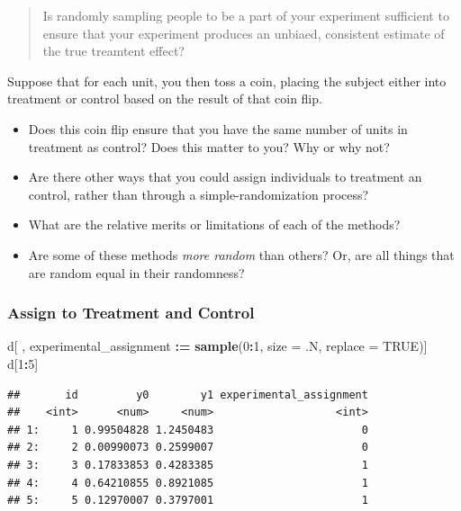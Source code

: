 \documentclass[
]{article}
\newenvironment{Shaded}{\begin{snugshade}}{\end{snugshade}}
\newcommand{\AttributeTok}[1]{\textcolor[rgb]{0.13,0.29,0.53}{#1}}
\newcommand{\ConstantTok}[1]{\textcolor[rgb]{0.56,0.35,0.01}{#1}}
\newcommand{\DecValTok}[1]{\textcolor[rgb]{0.00,0.00,0.81}{#1}}
\newcommand{\FunctionTok}[1]{\textcolor[rgb]{0.13,0.29,0.53}{\textbf{#1}}}
\newcommand{\NormalTok}[1]{#1}
\newcommand{\SpecialCharTok}[1]{\textcolor[rgb]{0.81,0.36,0.00}{\textbf{#1}}}
\providecommand{\tightlist}{%
  \setlength{\itemsep}{0pt}\setlength{\parskip}{0pt}}
\theoremstyle{definition}
\theoremstyle{definition}
\theoremstyle{definition}
\theoremstyle{definition}
\theoremstyle{remark}
\begin{document}
\begin{quote}
Is randomly sampling people to be a part of your experiment sufficient to ensure that your experiment produces an unbiaed, consistent estimate of the true treamtent effect?
\end{quote}

Suppose that for each unit, you then toss a coin, placing the subject either into treatment or control based on the result of that coin flip.

\begin{itemize}
\tightlist
\item
  Does this coin flip ensure that you have the same number of units in treatment as control? Does this matter to you? Why or why not?
\item
  Are there other ways that you could assign individuals to treatment an control, rather than through a simple-randomization process?
\item
  What are the relative merits or limitations of each of the methods?
\item
  Are some of these methods \emph{more random} than others? Or, are all things that are random equal in their randomness?
\end{itemize}

\subsubsection{Assign to Treatment and Control}\label{assign-to-treatment-and-control}

\begin{Shaded}
\begin{Highlighting}[]
\NormalTok{d[ , experimental\_assignment }\SpecialCharTok{:=} \FunctionTok{sample}\NormalTok{(}\DecValTok{0}\SpecialCharTok{:}\DecValTok{1}\NormalTok{, }\AttributeTok{size =}\NormalTok{ .N, }\AttributeTok{replace =} \ConstantTok{TRUE}\NormalTok{)]}
\NormalTok{d[}\DecValTok{1}\SpecialCharTok{:}\DecValTok{5}\NormalTok{]}
\end{Highlighting}
\end{Shaded}

\begin{verbatim}
##       id         y0        y1 experimental_assignment
##    <int>      <num>     <num>                   <int>
## 1:     1 0.99504828 1.2450483                       0
## 2:     2 0.00990073 0.2599007                       0
## 3:     3 0.17833853 0.4283385                       1
## 4:     4 0.64210855 0.8921085                       1
## 5:     5 0.12970007 0.3797001                       1
\end{verbatim}
\end{document}
